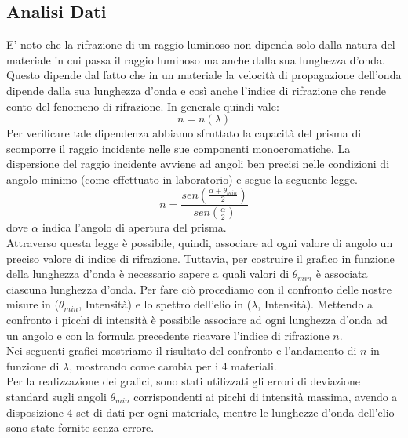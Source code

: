 \documentclass[letterpaper,11pt]{article}
\begin{document}
\begin{body}
\section{Analisi Dati} 
E' noto che la rifrazione di un raggio luminoso non dipenda solo dalla natura del materiale in cui passa il raggio luminoso ma anche dalla sua lunghezza d'onda. Questo dipende dal fatto che in un materiale la velocità di propagazione dell'onda dipende dalla sua lunghezza d'onda e così anche l'indice di rifrazione che rende conto del fenomeno di rifrazione. In generale quindi vale: 
\begin{equation}
n = n(\lambda)
\end{equation}
Per verificare tale dipendenza abbiamo sfruttato la capacità del prisma di scomporre il raggio incidente nelle sue componenti monocromatiche. La dispersione del raggio incidente avviene ad angoli ben precisi nelle condizioni di angolo minimo (come effettuato in laboratorio) e segue la seguente legge.
\begin{equation}
n = \frac{sen(\frac{\alpha  + \theta_{min}}{2})}{sen(\frac{\alpha}{2})}
\end{equation} 
dove $\alpha$ indica l'angolo di apertura del prisma. \\
Attraverso questa legge è possibile, quindi, associare ad ogni valore di angolo un preciso valore di indice di rifrazione. Tuttavia, per  costruire il grafico in funzione della lunghezza d'onda è necessario sapere a quali valori di $\theta_{min}$ è associata ciascuna lunghezza d'onda. Per fare ciò procediamo con il confronto delle nostre misure in ($\theta_{min}$, Intensità) e lo spettro dell'elio in ($\lambda$, Intensità). Mettendo a confronto i picchi di intensità è possibile associare ad ogni lunghezza d'onda ad un angolo e con la formula precedente ricavare l'indice di rifrazione $n$. \\
Nei seguenti grafici mostriamo il risultato del confronto e l'andamento di $n$ in funzione di $\lambda$, mostrando come cambia per i 4 materiali. \\
Per la realizzazione dei grafici, sono stati utilizzati gli errori di deviazione standard sugli angoli $\theta_{min}$ corrispondenti ai picchi di intensità massima, avendo a disposizione 4 set di dati per ogni materiale, mentre le lunghezze d'onda dell'elio sono state fornite senza errore.\\ 
  


\end{body}
\end{document}
